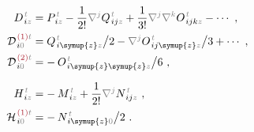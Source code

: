\begin{subequations} \label{eq:DH^(2-0)_0=}
\begin{align}
	D^{\;\!\mathcolor{gray}{t}}_{\;\! i\mathcolor{gray}{z}} &= P^{\;\!\mathcolor{gray}{t}}_{\;\! i\mathcolor{gray}{z}} - \frac{1}{2!} \mathcolor{gray}{\nabla^j} Q^{\;\!\mathcolor{gray}{t}}_{\;\! ij\mathcolor{gray}{z}} + \frac{1}{3!} \mathcolor{gray}{\nabla^j} \mathcolor{gray}{\nabla^k} O^{\;\!\mathcolor{gray}{t}}_{\;\! ijk\mathcolor{gray}{z}} - \cdots~, \label{eq:D^(0)=} \\
	{\mathcal{D}}^{\;\!\textcolor{Maroon}{(1)}\mathcolor{gray}{t}}_{\;\! i\mathcolor{gray}{0}} &= Q^{\;\!\mathcolor{gray}{t}}_{\;\! i\symup{z}\mathcolor{gray}{z}} \big/ 2 - \mathcolor{gray}{\nabla^j} O^{\;\!\mathcolor{gray}{t}}_{\;\! ij\symup{z}\mathcolor{gray}{z}} \big/ 3 + \cdots~, \label{eq:D^(1)_0=} \\
	{\mathcal{D}}^{\;\!\textcolor{Maroon}{(2)}\mathcolor{gray}{t}}_{\;\! i\mathcolor{gray}{0}} &= -\hspace{0.2em} O^{\;\!\mathcolor{gray}{t}}_{\;\! i\symup{z}\symup{z}\mathcolor{gray}{z}} \big/ 6~, \label{eq:D^(2)_0=} \\[0.7em]
	H^{\;\!\mathcolor{gray}{t}}_{\;\! i\mathcolor{gray}{z}} &= -\hspace{0.2em} M^{\;\!\mathcolor{gray}{t}}_{\;\! i \mathcolor{gray}{z}} + \frac{1}{2!} \mathcolor{gray}{\nabla^j} N^{\;\!\mathcolor{gray}{t}}_{\;\! ij\mathcolor{gray}{z}}~, \label{eq:H^(0)=} \\
	{\mathcal{H}}^{\;\!\textcolor{Maroon}{(1)}\mathcolor{gray}{t}}_{\;\! i\mathcolor{gray}{0}} &= -\hspace{0.2em} N^{\;\!\mathcolor{gray}{t}}_{\;\! i\symup{z}\mathcolor{gray}{0}} \big/ 2~. \label{eq:H^(1)_0=}
\end{align}
\end{subequations}

